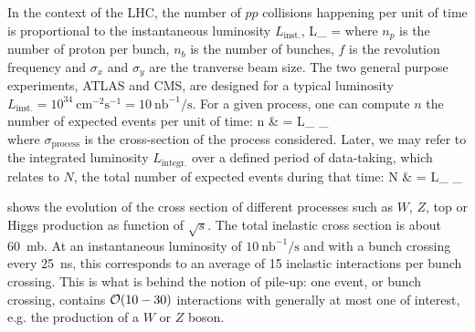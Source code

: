 

    In the context of the LHC, the number of $pp$ collisions happening per unit of time is
    proportional to the instantaneous luminosity $L_\text{inst.}$,
    {
        L_ = 
    }
    where $n_p$ is the number of proton per bunch, $n_b$ is the number of bunches, $f$ is
    the revolution frequency and $\sigma_x$ and $\sigma_y$ are the tranverse beam size.
    The two general purpose experiments, ATLAS and CMS, are designed for a typical luminosity
    $L_\text{inst.} = 10^{34}~\text{cm}^{-2} \text{s}^{-1} = 10~\text{nb}^{-1} / \text{s}$.
    For a given process, one can compute $n$ the number of expected events per unit of time:
    {
        n & = L_ \times \sigma_ \\
    }
    where $\sigma_\text{process}$ is the cross-section of the process considered. Later, we may refer
    to the integrated luminosity $L_\text{integr.}$ over a defined period of data-taking,
    which relates to $N$, the total number of expected events during that time:
    {
        N & = L_ \times \sigma_
    }

     shows the evolution of the cross section of different
    processes such as $W$, $Z$, top or Higgs production as function of $\sqrt{s}$. The
    total inelastic cross section is about 60~mb. At an instantaneous luminosity of
    $10~\text{nb}^{-1} / \text{s}$ and with a bunch crossing every 25~ns, this corresponds
    to an average of 15 inelastic interactions per bunch crossing. This is what is behind
    the notion of pile-up: one event, or bunch crossing, contains $\mathcal{O}(10-30)$ interactions
    with generally at most one of interest, e.g. the production of a $W$ or $Z$ boson.

